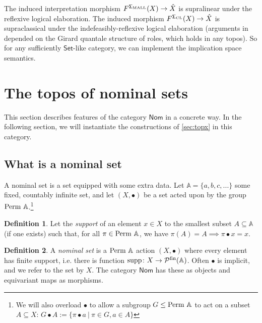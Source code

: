 \documentclass{article}
\theoremstyle{definition}
\newtheorem{definition}{Definition}[section]
\newcommand{\A}{\mathbb{A}}
\newcommand{\cP}{\mathcal{P}}
\newcommand{\cat}[1]{\mathsf{#1}}
\newcommand{\Set}{\cat{Set}}
\newcommand{\PA}{{\rm Perm\ \A}}
\newcommand{\supp}{\operatorname{supp}}
\begin{document}
The induced interpretation morphism $F^\cat{\Sigma_{\rm MALL}}(X)\to \hat X$ is supralinear under the reflexive logical elaboration. The induced morphism $F^\cat{\Sigma_{\rm CL}}(X)\to \hat X$ is supraclassical under the indefeasibly-reflexive logical elaboration (arguments in \cite{brown2026} depended on the Girard quantale structure of roles, which holds in any topos).
So for any sufficiently $\Set$-like category, we can implement the implication space semantics.


\section{The topos of nominal sets}
\label{sec:topnom}

 This section describes features of the category $\cat{Nom}$ in a concrete way. In the following section, we will instantiate the constructions of \cref{sec:topx} in this category.


\subsection{What is a nominal set}
\label{sec:rel}

A nominal set is a set equipped with some extra data. Let $\A=\{a,b,c,...\}$ some fixed, countably infinite set, and let $(X,\bullet)$ be a set acted upon by the group $\PA$.\footnote{We will also overload $\bullet$ to allow a subgroup $G \leq {\rm Perm\ }\A$ to act on a subset $A\subseteq X$: $G \bullet A := \{\pi \bullet a\ |\ \pi \in G,  a\in A \}$} 

\begin{definition}
    \label{def:supp}
    Let the {\it support} of an element $x\in X$ to the smallest subset $A\subseteq \A$  (if one exists) such that, for all $\pi \in \PA$, we have $\pi(A)=A \implies \pi \bullet x = x$. 
\end{definition}

\begin{definition}
    \label{def:nom}
    A {\it nominal set} is a  $\PA$ action $(X,\bullet)$ where every element has finite support, i.e. there is function $\supp\colon X\to \cP^{\rm fin}(\A)$. Often $\bullet$ is implicit, and we refer to the set by $X$. 
    The category $\cat{Nom}$ has these as objects and equivariant maps as morphisms.
\end{definition}
\end{document}
